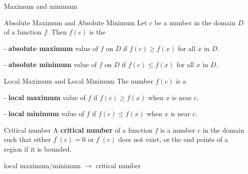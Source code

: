 




\begin{frame}{Maximum and minimum}
    \begin{block}{Absolute Maximum and Absolute Minimum}
        Let $c$ be a number in the domain $D$ of a function $f$. Then $f(c)$ is the

        - \textbf{absolute maximum} value of $f$ on $D$ if $f(c) \geqslant f(x)$ for all $x$ in $D$.

        - \textbf{absolute minimum} value of $f$ on $D$ if $f(c) \leqslant f(x)$ for all $x$ in $D$.
    \end{block}
    \begin{block}{Local Maximum and Local Minimum}
        The number $f(c)$ is a

        - \textbf{local maximum} value of $f$ if $f(c) \geqslant f(x)$ when $x$ is near $c$.

        - \textbf{local minimum} value of $f$ if $f(c) \leqslant f(x)$ when $x$ is near $c$.
    \end{block}
    \begin{block}{Critical number}
        A \textbf{critical number} of a function $f$ is a number $c$ in the domain such that either $f^\prime (c)=0$ or $f^\prime (c)$ does not exist, or the end points of a region if it is bounded.
    \end{block}
    local maximum/minimum $\rightarrow$ critical number
\end{frame}



